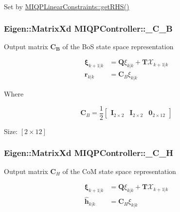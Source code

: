 \-Set by \hyperlink{classMIQPLinearConstraints_abf2bd3e8f0dfa5b919efa1b90b56232a}{\-M\-I\-Q\-P\-Linear\-Constraints\-::get\-R\-H\-S()} \hypertarget{classMIQPController_a5c6882cb248e9d16513868fea7835d6e}{
\subsubsection[{\-\_\-\-C\-\_\-\-B}]{\setlength{\rightskip}{0pt plus 5cm}\-Eigen\-::\-Matrix\-Xd {\bf \-M\-I\-Q\-P\-Controller\-::\-\_\-\-C\-\_\-\-B}}}\label{classMIQPController_a5c6882cb248e9d16513868fea7835d6e}
\-Output matrix $\mathbf{C_B}$ of the \-Bo\-S state space representation

\begin{align*} \mathbf{\xi}_{k+1|k} &= \mathbf{Q} \xi_{k|k} + \mathbf{T}\mathcal{X}_{k+1|k} \\ \mathbf{r}_{k|k} & =\mathbf{C}_B \xi_{k|k} \end{align*}

\-Where

\[ \mathbf{C}_B = \frac{1}{2} \left[ \begin{array}{ccc} \mathbf{I}_{2\times2} & \mathbf{I}_{2\times2} & \mathbf{0}_{2\times12} \end{array}\right] \]

\-Size\-: $[2\times12]$ \hypertarget{classMIQPController_a323718c0eaf8c8a7e159ea7f1ef5b72c}{
\subsubsection[{\-\_\-\-C\-\_\-\-H}]{\setlength{\rightskip}{0pt plus 5cm}\-Eigen\-::\-Matrix\-Xd {\bf \-M\-I\-Q\-P\-Controller\-::\-\_\-\-C\-\_\-\-H}}}\label{classMIQPController_a323718c0eaf8c8a7e159ea7f1ef5b72c}
\-Output matrix $\mathbf{C}_H$ of the \-Co\-M state space representation

\begin{align*} \mathbf{\xi}_{k+1|k} &= \mathbf{Q} \xi_{k|k} + \mathbf{T}\mathcal{X}_{k+1|k} \\ \hat{\mathbf{h}}_{k|k} & =\mathbf{C}_H \xi_{k|k} \end{align*}

